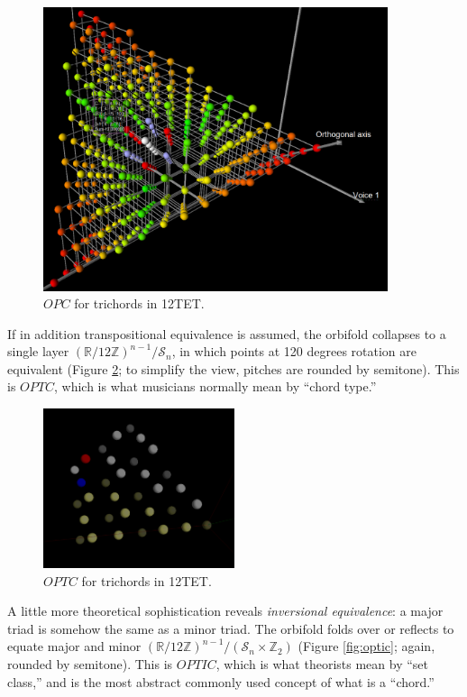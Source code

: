 \documentclass[english,11pt,letterpaper,onecolumn]{scrartcl}
\numberwithin{equation}{section}
\begin{document}
\begin{figure}
\centerline{\includegraphics[width = 0.9\textwidth]{opc}}
\caption{\label{fig:opc}
  $OPC$ for trichords in 12TET.}
\end{figure}

If in addition transpositional equivalence is assumed, the orbifold collapses to
a single layer $\left(\mathbb{R}/12\mathbb{Z}\right)^{n-1}/\mathcal{S}_{n}$, in
which points at 120 degrees rotation are equivalent (Figure \ref{fig:opttc}; to
simplify the view, pitches are rounded by semitone). This is $OPTC$, which is
what musicians normally mean by ``chord type.''

\begin{figure}
\centerline{\includegraphics[width = 0.5\textwidth]{opttc}}
\caption{\label{fig:opttc}
  $OPTC$ for trichords in 12TET.}
\end{figure}

A little more theoretical sophistication reveals \textit{inversional
equivalence}: a major triad is somehow the same as a minor triad. The orbifold
folds over or reflects to equate major and minor
$\left(\mathbb{R}/12\mathbb{Z}\right)^{n-1}/(\mathcal{S}_{n} \times
\mathbb{Z}_{2})$ (Figure \ref{fig:optic}; again, rounded by semitone). This is
$OPTIC$, which is what theorists mean by ``set class,'' and is the most abstract
commonly used concept of what is a ``chord.''
\end{document}

